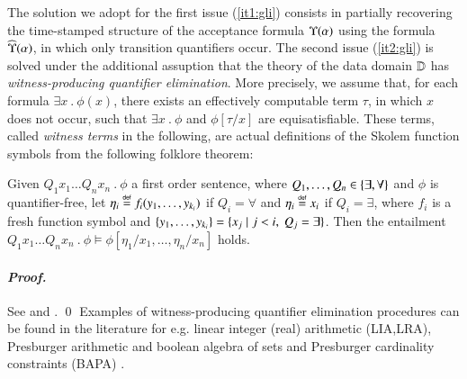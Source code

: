 The solution we adopt for the first issue (\ref{it1:gli}) consists in
partially recovering the time-stamped structure of the acceptance
formula $\Upsilon({\alpha})$ using the formula $\widehat{\Upsilon}({\alpha})$, in
which only transition quantifiers occur. The second issue
(\ref{it2:gli}) is solved under the additional assuption that the
theory of the data domain $\mathbb{D}$ has \emph{witness-producing
  quantifier elimination}. More precisely, we assume that, for each
formula $\exists x ~.~ \phi(x)$, there exists an effectively
computable term $\tau$, in which $x$ does not occur, such that
$\exists x ~.~ \phi$ and $\phi[\tau/x]$ are equisatisfiable. These
terms, called \emph{witness terms} in the following, are actual
definitions of the Skolem function symbols from the following folklore
theorem:

\begin{theorem}\label{thm:skolem}
  Given $Q_1 x_1 \ldots Q_n x_n ~.~ \phi$ a first order sentence,
  where $Q_1, \ldots, Q_n \in \{ \exists,\forall \}$ and $\phi$ is
  quantifier-free, let $\eta_i \stackrel{\scriptscriptstyle{\mathsf{def}}}{=} f_i(y_1,\ldots,y_{k_i})$ if $Q_i
  = \forall$ and $\eta_i \stackrel{\scriptscriptstyle{\mathsf{def}}}{=} x_i$ if $Q_i = \exists$, where $f_i$
  is a fresh function symbol and $\{ y_1, \ldots, y_{k_i} \} =
  \{ x_j \mid j < i,~ Q_j = \exists \}$. Then the entailment \(Q_1 x_1
  \ldots Q_n x_n ~.~ \phi \models \phi[\eta_1/x_1,\ldots,\eta_n/x_n]\)
  holds.
\end{theorem}
\paragraph{\em Proof.} See \cite[Theorem 2.1.8]{BorgerGraedelGurevich97} and
\cite[Lemma 2.1.9]{BorgerGraedelGurevich97}. \qed
\noindent
Examples of witness-producing quantifier elimination procedures can be
found in the literature for e.g. linear integer (real) arithmetic
(LIA,LRA), Presburger arithmetic and boolean algebra of sets and
Presburger cardinality constraints (BAPA)
\cite{KuncakMayerPiskacSuter12}.


